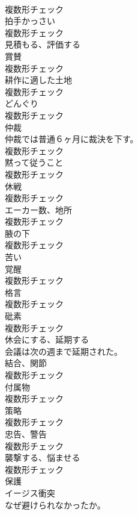 \documentclass[8pt]{extreport}
\begin{document}
\begin{CJK}{UTF8}{min}
\\	複数形チェック
\\	[名詞]	拍手かっさい	
\\	複数形チェック
\\	[動詞]	見積もる、評価する	
\\	[名詞]	賞賛	
\\	複数形チェック
\\	[名詞]	耕作に適した土地	
\\	複数形チェック
\\	[名詞]	どんぐり	
\\	複数形チェック
\\	[名詞]	仲裁	
\\	仲裁では普通６ヶ月に裁決を下す。	
\\	複数形チェック
\\	[名詞]	黙って従うこと	
\\	複数形チェック
\\	[名詞]	休戦	
\\	複数形チェック
\\	[名詞]	エーカー数、地所	
\\	複数形チェック
\\	[名詞]	腋の下	
\\	複数形チェック
\\	[形容詞]	苦い	
\\	[名詞]	覚醒	
\\	複数形チェック
\\	[名詞]	格言	
\\	複数形チェック
\\	[名詞]	砒素	
\\	複数形チェック
\\	[動詞]	休会にする、延期する	
\\	会議は次の週まで延期された。	
\\	[名詞]	結合、関節	
\\	複数形チェック
\\	[名詞]	付属物	
\\	複数形チェック
\\	[名詞]	策略	
\\	複数形チェック
\\	[名詞]	忠告、警告	
\\	複数形チェック
\\	[名詞]	襲撃する、悩ませる	
\\	複数形チェック
\\	[名詞]	保護	
\\	イージス衝突 
\\	なぜ避けられなかったか。	

\end{CJK}
\end{document}
